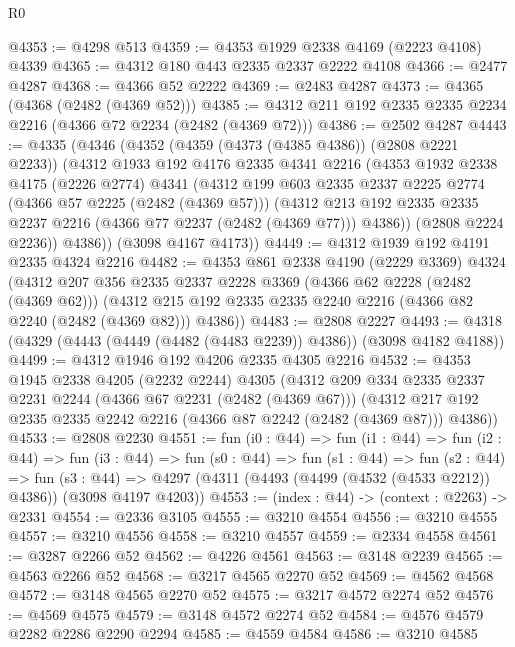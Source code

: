 \begin{lexlean}{R0}
\begin{coremodule}
@4353 := @4298 @513
@4359 := @4353 @1929 @2338 @4169 (@2223 @4108) @4339
@4365 := @4312 @180 @443 @2335 @2337 @2222 @4108
@4366 := @2477 @4287
@4368 := @4366 @52 @2222
@4369 := @2483 @4287
@4373 := @4365 (@4368 (@2482 (@4369 @52)))
@4385 := @4312 @211 @192 @2335 @2335 @2234 @2216 (@4366 @72 @2234 (@2482 (@4369 @72)))
@4386 := @2502 @4287
@4443 := @4335
    (@4346
      (@4352
        (@4359 (@4373 (@4385 @4386)) (@2808 @2221 @2233))
        (@4312
          @1933
          @192
          @4176
          @2335
          @4341
          @2216
          (@4353
            @1932
            @2338
            @4175
            (@2226 @2774)
            @4341
            (@4312
              @199
              @603
              @2335
              @2337
              @2225
              @2774
              (@4366 @57 @2225 (@2482 (@4369 @57)))
              (@4312 @213 @192 @2335 @2335 @2237 @2216 (@4366 @77 @2237 (@2482 (@4369 @77))) @4386))
            (@2808 @2224 @2236))
          @4386))
      (@3098 @4167 @4173))
@4449 := @4312 @1939 @192 @4191 @2335 @4324 @2216
@4482 := @4353
    @861
    @2338
    @4190
    (@2229 @3369)
    @4324
    (@4312
      @207
      @356
      @2335
      @2337
      @2228
      @3369
      (@4366 @62 @2228 (@2482 (@4369 @62)))
      (@4312 @215 @192 @2335 @2335 @2240 @2216 (@4366 @82 @2240 (@2482 (@4369 @82))) @4386))
@4483 := @2808 @2227
@4493 := @4318 (@4329 (@4443 (@4449 (@4482 (@4483 @2239)) @4386)) (@3098 @4182 @4188))
@4499 := @4312 @1946 @192 @4206 @2335 @4305 @2216
@4532 := @4353
    @1945
    @2338
    @4205
    (@2232 @2244)
    @4305
    (@4312
      @209
      @334
      @2335
      @2337
      @2231
      @2244
      (@4366 @67 @2231 (@2482 (@4369 @67)))
      (@4312 @217 @192 @2335 @2335 @2242 @2216 (@4366 @87 @2242 (@2482 (@4369 @87))) @4386))
@4533 := @2808 @2230
@4551 := fun (i0 : @44) =>
  fun (i1 : @44) =>
  fun (i2 : @44) =>
  fun (i3 : @44) =>
  fun (s0 : @44) =>
  fun (s1 : @44) =>
  fun (s2 : @44) =>
  fun (s3 : @44) => @4297 (@4311 (@4493 (@4499 (@4532 (@4533 @2212)) @4386)) (@3098 @4197 @4203))
@4553 := (index : @44) -> (context : @2263) -> @2331
@4554 := @2336 @3105
@4555 := @3210 @4554
@4556 := @3210 @4555
@4557 := @3210 @4556
@4558 := @3210 @4557
@4559 := @2334 @4558
@4561 := @3287 @2266 @52
@4562 := @4226 @4561
@4563 := @3148 @2239
@4565 := @4563 @2266 @52
@4568 := @3217 @4565 @2270 @52
@4569 := @4562 @4568
@4572 := @3148 @4565 @2270 @52
@4575 := @3217 @4572 @2274 @52
@4576 := @4569 @4575
@4579 := @3148 @4572 @2274 @52
@4584 := @4576 @4579 @2282 @2286 @2290 @2294
@4585 := @4559 @4584
@4586 := @3210 @4585

\end{coremodule}
\end{lexlean}
